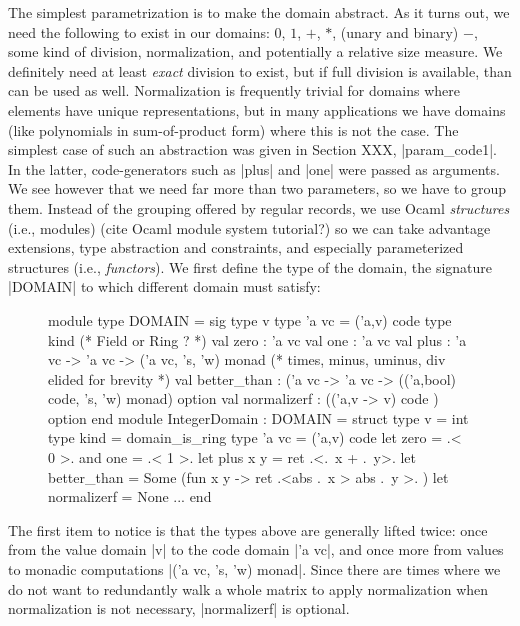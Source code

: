 \documentclass{llncs}
\begin{document}
The simplest parametrization is to make the domain abstract. As it 
turns out, we need the following to exist in our domains:  $0$, $1$,
$+$, $*$, (unary and binary) $-$, some kind of division, normalization,
and potentially a relative size measure.  We definitely need at least
\emph{exact} division to exist, but if full division is available, than
can be used as well.  Normalization is frequently trivial for domains
where elements have unique representations, but in many applications
we have domains (like polynomials in sum-of-product form) where this
is not the case.  The simplest case of such an abstraction was given
in Section XXX, |param_code1|. In the latter, code-generators such as
|plus| and |one| were passed as arguments. We see however that we 
need far more than two parameters, so we have to group them. Instead
of the grouping offered by regular records, we use Ocaml
\emph{structures} (i.e., modules) (cite Ocaml module system tutorial?)
so we can take advantage extensions, type abstraction and constraints,
and especially parameterized structures (i.e., \emph{functors}).
We first define the type of the domain, the signature |DOMAIN| to which
different domain must satisfy:
\begin{figure}
\begin{code}
module type DOMAIN = sig
  type v    type 'a vc = ('a,v) code
  type kind (* Field or Ring ? *)
  val zero : 'a vc   val one : 'a vc
  val plus : 'a vc -> 'a vc -> ('a vc, 's, 'w) monad
  (* times, minus, uminus, div elided for brevity *)
  val better_than : ('a vc -> 'a vc -> 
      (('a,bool) code, 's, 'w) monad) option
  val normalizerf : (('a,v -> v) code ) option
end 
module IntegerDomain : DOMAIN = struct
  type v = int  type kind = domain_is_ring
  type 'a vc = ('a,v) code
  let zero = .< 0 >.  and one = .< 1 >. 
  let plus x y = ret .<.~x + .~y>. 
  let better_than = Some (fun x y -> ret .<abs .~x > abs .~y >. )
  let normalizerf = None
  ...
end
\end{code}
\end{figure}
\noindent  The first item to notice is that the types above are
generally lifted twice: once from the value domain |v| to the code
domain |'a vc|, and once more from values to monadic computations
|('a vc, 's, 'w) monad|.  Since there are times where we do not want
to redundantly walk a whole matrix to apply normalization when 
normalization is not necessary, |normalizerf| is optional.
\end{document}

